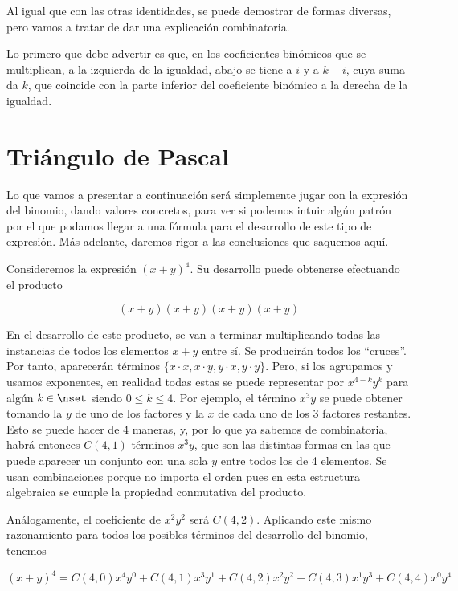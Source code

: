 Al igual que con las otras identidades, se puede demostrar de formas
diversas, pero vamos a tratar de dar una explicación combinatoria.

Lo primero que debe advertir es que, en los coeficientes binómicos que se
multiplican, a la izquierda de la igualdad, abajo se tiene a $i$ y a $k -
i$, cuya suma da $k$, que coincide con la parte inferior del coeficiente
binómico a la derecha de la igualdad.







\section{Triángulo de Pascal}

Lo que vamos a presentar a continuación será simplemente jugar con la
expresión del binomio, dando valores concretos, para ver si podemos intuir
algún patrón por el que podamos llegar a una fórmula para el desarrollo de
este tipo de expresión. Más adelante, daremos rigor a las conclusiones que
saquemos aquí.

Consideremos la expresión $(x + y)^4$. Su desarrollo puede obtenerse
efectuando el producto

$$ (x + y)(x + y)(x + y)(x + y) $$

En el desarrollo de este producto, se van a terminar multiplicando todas las
instancias de todos los elementos $x + y$ entre sí. Se producirán todos los
``cruces''. Por tanto, aparecerán términos $\{x \cdot x, x \cdot y, y \cdot
x, y \cdot y\}$. Pero, si los agrupamos y usamos exponentes, en realidad
todas estas se puede representar por $x^{4-k} y^k$ para algún $k \in \nset$
siendo $0 \leq k \leq 4$. Por ejemplo, el término $x^3 y$ se puede obtener
tomando la $y$ de uno de los factores y la $x$ de cada uno de los 3 factores
restantes. Esto se puede hacer de 4 maneras, y, por lo que ya sabemos de
combinatoria, habrá entonces $C(4, 1)$ términos $x^3 y$, que son las
distintas formas en las que puede aparecer un conjunto con una sola $y$
entre todos los de 4 elementos. Se usan combinaciones porque no importa el
orden pues en esta estructura algebraica se cumple la propiedad conmutativa
del producto.

Análogamente, el coeficiente de $x^2 y^2$ será $C(4, 2)$. Aplicando este
mismo razonamiento para todos los posibles términos del desarrollo del
binomio, tenemos

$$ (x + y)^4 = C(4, 0) x^4 y^0 + C(4, 1) x^3 y^1 + C(4, 2) x^2 y^2 + C(4, 3)
x^1 y^3 + C(4, 4) x^0 y^4 $$

